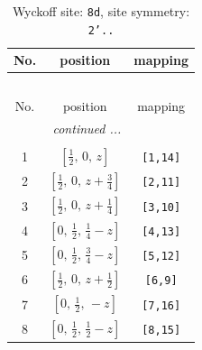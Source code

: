 \documentclass[fleqn,8pt]{jsarticle}
\begin{document}
\begin{longtable}{ccc}
\caption{Wyckoff site: {\tt 8d}, site symmetry: {\tt 2'..}}
 \\
 \hline \hline
No. & position & mapping \\ \hline \endfirsthead

\multicolumn{2}{l}{\tablename\ \thetable{}} \\
 \hline \hline
No. & position & mapping \\ \hline \endhead

 \hline \hline
\multicolumn{2}{r}{\footnotesize\it continued ...} \\ \endfoot

 \hline \hline
\multicolumn{2}{r}{} \\ \endlastfoot

1 & $\left[ \frac{1}{2},\, 0,\, z \right]$ & {\tt [1,14]} \\ \hline
2 & $\left[ \frac{1}{2},\, 0,\, z + \frac{3}{4} \right]$ & {\tt [2,11]} \\ \hline
3 & $\left[ \frac{1}{2},\, 0,\, z + \frac{1}{4} \right]$ & {\tt [3,10]} \\ \hline
4 & $\left[ 0,\, \frac{1}{2},\, \frac{1}{4} - z \right]$ & {\tt [4,13]} \\ \hline
5 & $\left[ 0,\, \frac{1}{2},\, \frac{3}{4} - z \right]$ & {\tt [5,12]} \\ \hline
6 & $\left[ \frac{1}{2},\, 0,\, z + \frac{1}{2} \right]$ & {\tt [6,9]} \\ \hline
7 & $\left[ 0,\, \frac{1}{2},\, - z \right]$ & {\tt [7,16]} \\ \hline
8 & $\left[ 0,\, \frac{1}{2},\, \frac{1}{2} - z \right]$ & {\tt [8,15]} \\
\end{longtable}
\renewcommand{\arraystretch}{1.2}
\end{document}
